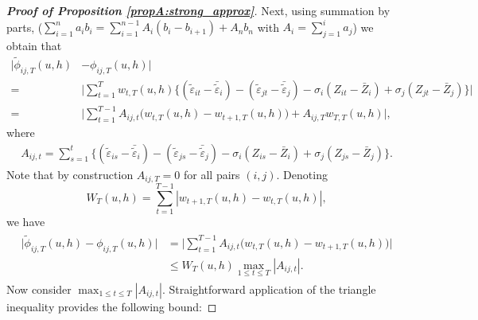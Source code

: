 \documentclass[a4paper,12pt]{article}
\begin{document}
\begin{proof}[\textnormal{\textbf{Proof of Proposition \ref{propA:strong_approx}}}]
Next, using summation by parts, ($\sum_{i=1}^n a_i b_i = \sum_{i=1}^{n-1} A_i (b_i - b_{i+1}) + A_n b_n$ with \linebreak $A_i = \sum_{j=1}^i a_j$) 
we obtain that 
\begin{align*}
\big| \widetilde{\phi}_{ij, T}(u,h) &- \phi_{ij, T}(u,h) \big|  \\
=&\bigg|\sum_{t=1}^T w_{t,T}(u,h) \big\{ (\widetilde{\varepsilon}_{it} - \bar{\widetilde{\varepsilon}}_i) - (\widetilde{\varepsilon}_{jt} - \bar{\widetilde{\varepsilon}}_j) -{\sigma}_i (Z_{it} - \bar{Z}_i) + {\sigma}_j (Z_{jt} - \bar{Z}_j) \big\}\bigg|  \\
=&\Big|\sum_{t=1}^{T-1} A_{ij, t} \big(w_{t,T}(u,h) -w_{t+1,T}(u,h)\big) + A_{ij, T} w_{T,T}(u,h)\Big|,
\end{align*}
where 
\begin{align*}
A_{ij, t} = \sum_{s=1}^t \big\{ (\widetilde{\varepsilon}_{is} - \bar{\widetilde{\varepsilon}}_i)  - (\widetilde{\varepsilon}_{js} - \bar{\widetilde{\varepsilon}}_j) -{\sigma}_i (Z_{is} - \bar{Z}_i) + {\sigma}_j (Z_{js} - \bar{Z}_j) \big\}.
\end{align*}
Note that by construction $A_{ij, T} = 0$ for all pairs $(i, j)$. Denoting 
\[ W_T(u,h) = \sum\limits_{t=1}^{T-1} |w_{t+1,T}(u,h) - w_{t,T}(u,h)|,\]
we have 
\begin{align}\label{eq-strongapprox-bound3}
\begin{split}
\big| \widetilde{\phi}_{ij, T}(u,h) - \phi_{ij, T}(u,h) \big| &= \Big|\sum_{t=1}^{T-1} A_{ij, t} \big(w_{t,T}(u,h) -w_{t+1,T}(u,h)\big)\Big|\\
&\le W_T(u, h)\max_{1 \le t \le T} |A_{ij, t}|.
\end{split}
\end{align}
Now consider $\max_{1 \le t \le T} |A_{ij, t}|$. Straightforward application of the triangle inequality provides the following bound:


\end{proof}
\end{document}
